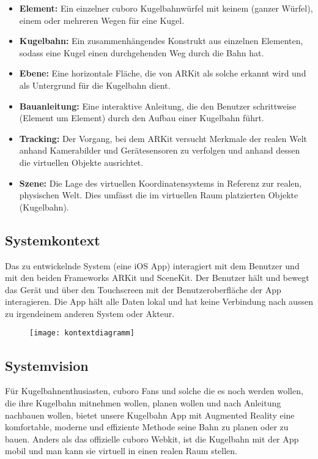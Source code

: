 \begin{itemize}
	\item \textbf{Element:} Ein einzelner cuboro Kugelbahnwürfel mit keinem (ganzer Würfel), einem oder mehreren Wegen für eine Kugel.
	\item \textbf{Kugelbahn:} Ein zusammenhängendes Konstrukt aus einzelnen Elementen, sodass eine Kugel einen durchgehenden Weg durch die Bahn hat.
	\item \textbf{Ebene:} Eine horizontale Fläche, die von ARKit als solche erkannt wird und als Untergrund für die Kugelbahn dient.
	\item \textbf{Bauanleitung:} Eine interaktive Anleitung, die den Benutzer schrittweise (Element um Element) durch den Aufbau einer Kugelbahn führt.
  \item \textbf{Tracking:} Der Vorgang, bei dem ARKit versucht Merkmale der realen Welt anhand Kamerabilder und Gerätesensoren zu verfolgen und anhand dessen die virtuellen Objekte ausrichtet.
  \item \textbf{Szene:} Die Lage des virtuellen Koordinatensystems in Referenz zur realen, physischen Welt. Dies umfässt die im virtuellen Raum platzierten Objekte (Kugelbahn).
\end{itemize}

\subsection{Systemkontext}

Das zu entwickelnde System (eine iOS App) interagiert mit dem Benutzer und mit den beiden Frameworks ARKit und SceneKit. Der Benutzer hält und bewegt das Gerät und über den Touchscreen mit der Benutzeroberfläche der App interagieren. Die App hält alle Daten lokal und hat keine Verbindung nach aussen zu irgendeinem anderen System oder Akteur.

\begin{figure}
  \texttt{[image: kontextdiagramm]}
\end{figure}

\subsection{Systemvision}

Für Kugelbahnenthusiasten, cuboro Fans und solche die es noch werden wollen,
die ihre Kugelbahn mitnehmen wollen, planen wollen und nach Anleitung nachbauen wollen,
bietet unsere Kugelbahn App
mit Augmented Reality
eine komfortable, moderne und effiziente Methode seine Bahn zu planen oder zu bauen.
Anders als das offizielle cuboro Webkit,
ist die Kugelbahn mit der App mobil und man kann sie virtuell in einen realen Raum stellen.

